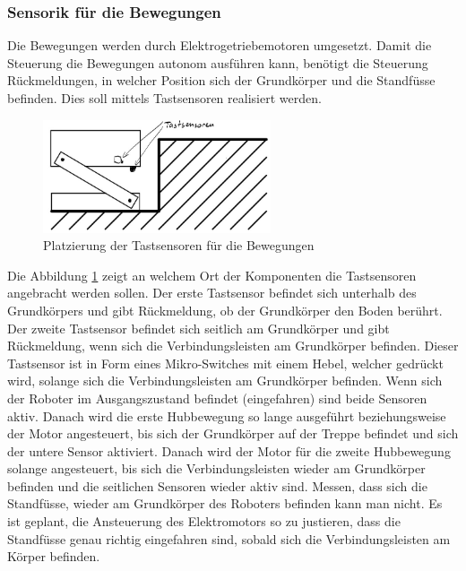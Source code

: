 \subsubsection{Sensorik für die Bewegungen}
Die Bewegungen werden durch Elektrogetriebemotoren umgesetzt. Damit die Steuerung die Bewegungen autonom ausführen kann, benötigt die Steuerung Rückmeldungen, in welcher Position sich der Grundkörper und die Standfüsse befinden. Dies soll mittels Tastsensoren realisiert werden.

\begin{figure}[h]
  \includegraphics[width=0.6\textwidth]{img/Treppensteigen/Sensoren_Treppensteigen2.png}
  \centering
  \caption{Platzierung der Tastsensoren für die Bewegungen}
  \label{fig:sensoren-treppensteigen2}
\end{figure}

Die Abbildung \ref{fig:sensoren-treppensteigen2} zeigt an welchem Ort der Komponenten die Tastsensoren angebracht werden sollen. Der erste Tastsensor befindet sich unterhalb des Grundkörpers und gibt Rückmeldung, ob der Grundkörper den Boden berührt. Der zweite Tastsensor befindet sich seitlich am Grundkörper und gibt Rückmeldung, wenn sich die Verbindungsleisten am Grundkörper befinden. Dieser Tastsensor ist in Form eines Mikro-Switches mit einem Hebel, welcher gedrückt wird, solange sich die Verbindungsleisten am Grundkörper befinden. Wenn sich der Roboter im Ausgangszustand befindet (eingefahren) sind beide Sensoren aktiv. Danach wird die erste Hubbewegung so lange ausgeführt beziehungsweise der Motor angesteuert, bis sich der Grundkörper auf der Treppe befindet und sich der untere Sensor aktiviert. Danach wird der Motor für die zweite  Hubbewegung solange angesteuert, bis sich die Verbindungsleisten wieder am Grundkörper befinden und die seitlichen Sensoren wieder aktiv sind. Messen, dass sich die Standfüsse, wieder am Grundkörper des Roboters befinden kann man nicht. Es ist geplant, die Ansteuerung des Elektromotors so zu justieren, dass die Standfüsse genau richtig eingefahren sind, sobald sich die Verbindungsleisten am Körper befinden.

